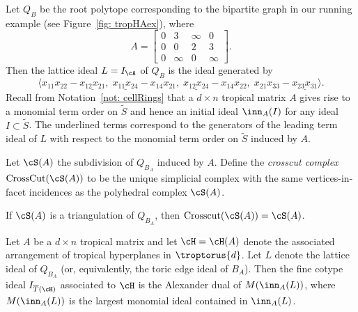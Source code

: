 \begin{example}\label{ex: latticeIdeal} Let $Q_B$ be the root polytope corresponding to the bipartite graph in our running example (see Figure~\ref{fig: tropHAex}), where
\[A= \begin{bmatrix} 0 & 3 & \infty & 0 \\ 0 & 0 & 2 & 3 \\ 0 & \infty & 0 & \infty \end{bmatrix}.\]
\noindent
Then the lattice ideal $L = I_\cA$ of $Q_B$ is the ideal generated by
\begin{equation}\label{eq: latticeIdealLead}
\langle x_{11}x_{22} - \underline{x_{12} x_{21}}, \; \underline{x_{11} x_{24}} - x_{14} x_{21}, \; \underline{x_{12} x_{24}} - x_{14} x_{22}, \; x_{21} x_{33} - \underline{x_{23} x_{31}}\rangle.
\end{equation}
Recall from Notation~\ref{not: cellRings} that a $d \times n$ tropical matrix $A$ gives rise to a monomial term order on $\widetilde{S}$ and hence an initial ideal $\inn_A(I)$ for any ideal $I \subset \widetilde{S}$.
The underlined terms correspond to the generators of the leading term ideal of $L$ with respect to the monomial term order on $\widetilde S$ induced by $A$.
\end{example}


\begin{definition}\label{def: crosscut} Let $\cS(A)$ the subdivision of $Q_{B_A}$ induced by $A$. Define the \emph{crosscut complex} $\textrm{CrossCut}(\cS(A))$ to be the unique simplicial complex with the same vertices-in-facet incidences as the polyhedral complex $\cS(A)$.
\end{definition}

\begin{remark} If $\cS(A)$ is a triangulation of $Q_{B_A}$, then $\textrm{Crosscut}(\cS(A)) = \cS(A)$.
\end{remark}

\begin{prop}\label{prop: cotypeIdealAD}

Let $A$ be a $d \times n$ tropical matrix and let $\cH = \cH(A)$ denote the associated arrangement of tropical hyperplanes in $\troptorus{d}$. Let $L$ denote the lattice ideal of $Q_{B_A}$ (or, equivalently, the toric edge ideal of $B_A$). Then  the fine cotype ideal $I_{\overline{T}(\cH)}$ associated to $\cH$ is the Alexander dual of $M(\inn_A(L))$, where $M(\inn_A(L))$ is the largest monomial ideal contained in $\inn_A(L)$.
\end{prop}

